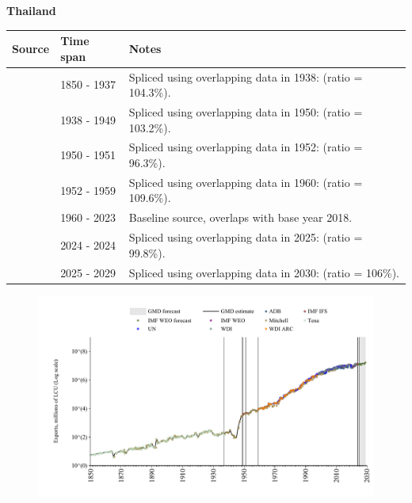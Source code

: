 \documentclass[12pt,a4paper,landscape]{article}
\begin{document}
\begin{adjustbox}{max totalsize={\paperwidth}{\paperheight},center}
\begin{minipage}[t][\textheight][t]{\textwidth}
\vspace*{0.5cm}
{}
\begin{center}
{\Large\bfseries Thailand}
\end{center}
\vspace{0.5cm}
\begin{table}[H]
\centering
\small
\begin{tabular}{|l|l|l|}
\hline
\textbf{Source} & \textbf{Time span} & \textbf{Notes} \\
\hline
\rowcolor{white}\cite{Tena}& 1850 - 1937 &Spliced using overlapping data in 1938: (ratio = 104.3\%).\\
\rowcolor{lightgray}\cite{Mitchell}& 1938 - 1949 &Spliced using overlapping data in 1950: (ratio = 103.2\%).\\
\rowcolor{white}\cite{IMF_IFS}& 1950 - 1951 &Spliced using overlapping data in 1952: (ratio = 96.3\%).\\
\rowcolor{lightgray}\cite{Mitchell}& 1952 - 1959 &Spliced using overlapping data in 1960: (ratio = 109.6\%).\\
\rowcolor{white}\cite{WDI}& 1960 - 2023 &Baseline source, overlaps with base year 2018.\\
\rowcolor{lightgray}\cite{IMF_IFS}& 2024 - 2024 &Spliced using overlapping data in 2025: (ratio = 99.8\%).\\
\rowcolor{white}\cite{IMF_WEO_forecast}& 2025 - 2029 &Spliced using overlapping data in 2030: (ratio = 106\%).\\
\hline
\end{tabular}
\end{table}
\begin{figure}[H]
\centering
\includegraphics[width=\textwidth,height=0.6\textheight,keepaspectratio]{graphs/THA_exports.pdf}
\end{figure}
\end{minipage}
\end{adjustbox}
\end{document}
